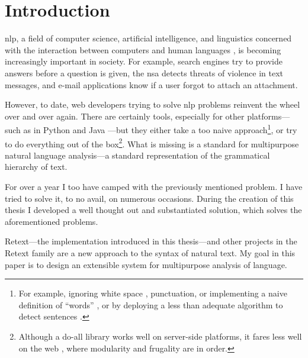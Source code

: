 
\begingroup
\let\clearpage\relax
\let\cleardoublepage\relax
\let\cleardoublepage\relax

\chapter*{Introduction}

\Gls{nlp}, a field of computer science, artificial intelligence, and
linguistics concerned with the interaction between computers and human
languages \autocite[according to WikiPedia, see
][]{wikipedia-natural-language-processing}, is becoming increasingly
important in society. For example, search engines try to provide answers
before a question is given, the \gls{nsa} detects threats of violence in text
messages, and e-mail applications know if a user forgot to attach an
attachment.

However, to date, web developers trying to solve \gls{nlp} problems
reinvent the wheel over and over again. There are certainly tools,
especially for other platforms---such as in Python
\autocite{nltk-source} and Java \autocite{opennlp-source}---but they either
take a too naive approach\footnote{For example, ignoring white space
  \autocite[see][]{loadfive/knwl-source-code}, punctuation, or
  implementing a naive definition of ``words'' \autocite[such
  as][]{nhunzaker/speakeasy-source-code}, or by deploying a less than
  adequate algorithm to detect sentences \autocite[such
  as][]{nytimes/emphasis-source-code}.}, or try to do everything out of
the box\footnote{Although a do-all library works well on server-side
  platforms, it fares less well on the web \autocite[such
  as][]{NaturalNode/natural-source-code}, where modularity and frugality
  are in order.}. What is missing is a standard for multipurpose natural
language analysis---a standard representation of the grammatical
hierarchy of text.

For over a year I too have camped with the previously mentioned problem.
I have tried to solve it, to no avail, on numerous occasions. During the
creation of this thesis I developed a well thought out and substantiated
solution, which solves the aforementioned problems.

Retext---the implementation introduced in this thesis---and other projects
in the Retext family are a new approach to the syntax of natural text.
My goal in this paper is to design an extensible system for multipurpose
analysis of language.

